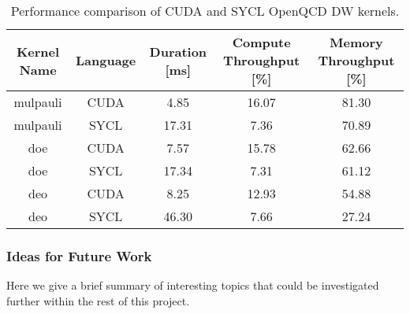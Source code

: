 \documentclass[../main]{subfiles}
\begin{document}
\begin{center}
	\begin{table}
		\begin{tabular}{||c c c c c||}
			\hline
			Kernel Name & Language & Duration [ms] & Compute Throughput [\%] & Memory Throughput [\%] \\
			\hline\hline
			mulpauli    & CUDA     & 4.85          & 16.07                   & 81.30                  \\
			\hline
			mulpauli    & SYCL     & 17.31         & 7.36                    & 70.89                  \\
			\hline
			doe         & CUDA     & 7.57          & 15.78                   & 62.66                  \\
			\hline
			doe         & SYCL     & 17.34         & 7.31                    & 61.12                  \\
			\hline
			deo         & CUDA     & 8.25          & 12.93                   & 54.88                  \\
			\hline
			deo         & SYCL     & 46.30         & 7.66                    & 27.24                  \\
			\hline
		\end{tabular}
		\caption{\label{tab:openqcd_perf}Performance comparison of CUDA and SYCL OpenQCD DW kernels.}
	\end{table}
\end{center}


\subsubsection{Ideas for Future Work}\label{sec:openqcd_future_work}

Here we give a brief summary of interesting topics that could be investigated further within the rest of this project.
\end{document}
